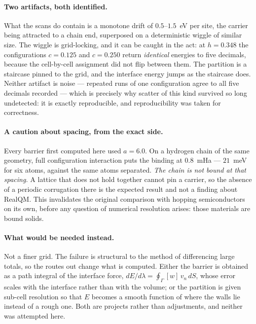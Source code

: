 \documentclass[11pt]{article}
\begin{document}
\paragraph{Two artifacts, both identified.} What the scans do contain is a monotone drift of
$0.5$--$1.5$~eV per site, the carrier being attracted to a chain end, superposed on a deterministic
wiggle of similar size. The wiggle is grid-locking, and it can be caught in the act: at $h=0.348$
the configurations $c=0.125$ and $c=0.250$ return \emph{identical} energies to five decimals,
because the cell-by-cell assignment did not flip between them. The partition is a staircase pinned
to the grid, and the interface energy jumps as the staircase does. Neither artifact is noise ---
repeated runs of one configuration agree to all five decimals recorded --- which is precisely why
scatter of this kind survived so long undetected: it is exactly reproducible, and reproducibility
was taken for correctness.

\paragraph{A caution about spacing, from the exact side.} Every barrier first computed here used
$a=6.0$. On a hydrogen chain of the same geometry, full configuration interaction puts the binding
at $0.8$~mHa --- $21$~meV for six atoms, against the same atoms separated. \emph{The chain is not
bound at that spacing.} A lattice that does not hold together cannot pin a carrier, so the absence
of a periodic corrugation there is the expected result and not a finding about RealQM. This
invalidates the original comparison with hopping semiconductors on its own, before any question of
numerical resolution arises: those materials are bound solids.

\paragraph{What would be needed instead.} Not a finer grid. The failure is structural to the method
of differencing large totals, so the routes out change what is computed. Either the barrier is
obtained as a path integral of the interface force, $dE/d\lambda=\oint_\Gamma[w]\,v_n\,dS$,
whose error scales with the interface rather than with the volume; or the partition is given
sub-cell resolution so that $E$ becomes a smooth function of where the walls lie instead of a rough
one. Both are projects rather than adjustments, and neither was attempted here.
\end{document}
